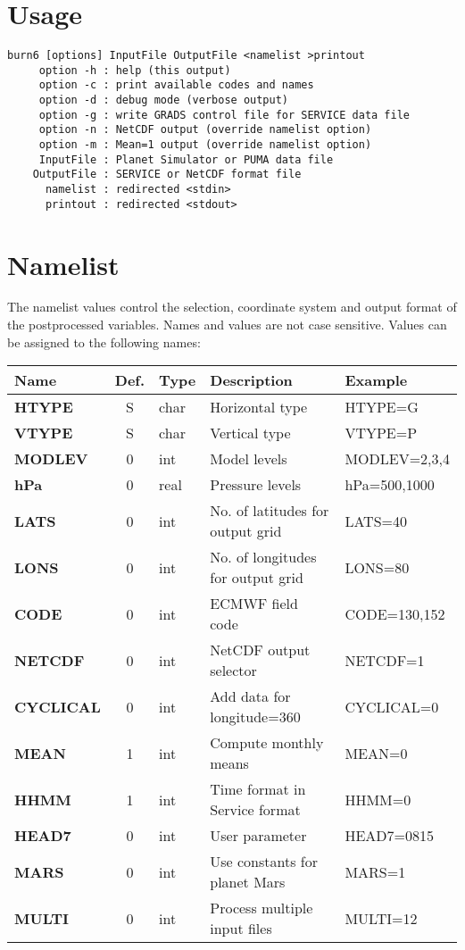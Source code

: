 \section{Usage}

\begin{verbatim}
burn6 [options] InputFile OutputFile <namelist >printout
     option -h : help (this output)
     option -c : print available codes and names
     option -d : debug mode (verbose output)
     option -g : write GRADS control file for SERVICE data file
     option -n : NetCDF output (override namelist option)
     option -m : Mean=1 output (override namelist option)
     InputFile : Planet Simulator or PUMA data file
    OutputFile : SERVICE or NetCDF format file
      namelist : redirected <stdin>
      printout : redirected <stdout>
\end{verbatim}

\section{Namelist}

The namelist values control the selection, coordinate system
and output format of the postprocessed variables.
Names and values are not case sensitive.
Values can be assigned to the following names: \vspace{0.4cm}

\begin{tabular}{|l|c|l|l|l|}
\hline
Name   & Def. & Type & Description & Example \\
\hline
{\bf HTYPE    }& S & char & Horizontal type                 & HTYPE=G \\
{\bf VTYPE    }& S & char & Vertical type                   & VTYPE=P \\
{\bf MODLEV   }& 0 & int  & Model levels                    & MODLEV=2,3,4 \\
{\bf hPa      }& 0 & real & Pressure levels                 & hPa=500,1000 \\
{\bf LATS     }& 0 & int  & No. of latitudes for output grid  & LATS=40      \\
{\bf LONS     }& 0 & int  & No. of longitudes for output grid & LONS=80      \\
{\bf CODE     }& 0 & int  & ECMWF field code                & CODE=130,152 \\
{\bf NETCDF   }& 0 & int  & NetCDF output selector          & NETCDF=1 \\
{\bf CYCLICAL }& 0 & int  & Add data for longitude=360      & CYCLICAL=0 \\
{\bf MEAN     }& 1 & int  & Compute monthly means           & MEAN=0 \\
{\bf HHMM     }& 1 & int  & Time format in Service format   & HHMM=0 \\
{\bf HEAD7    }& 0 & int  & User parameter                  & HEAD7=0815 \\
{\bf MARS     }& 0 & int  & Use constants for planet Mars   & MARS=1 \\
{\bf MULTI    }& 0 & int  & Process multiple input files    & MULTI=12 \\
\hline
\end{tabular}

